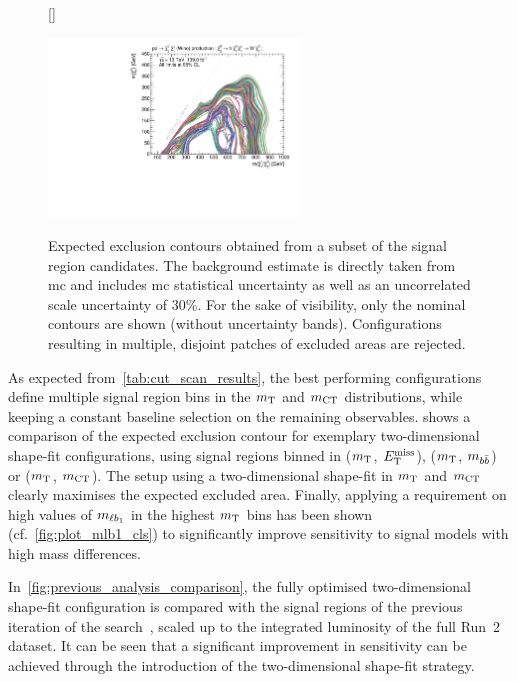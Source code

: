 \begin{figure}
[\FBwidth]
{\caption{Expected exclusion contours obtained from a subset of the signal region candidates. The background estimate is directly taken from \gls{mc} and includes \gls{mc} statistical uncertainty as well as an uncorrelated scale uncertainty of 30\%. For the sake of visibility, only the nominal contours are shown (without uncertainty bands). Configurations resulting in multiple, disjoint patches of excluded areas are rejected.}\label{fig:fit_scan_optimisation}}
{\includegraphics[width=0.60\textwidth]{HF/batch_compare}}
\end{figure}

As expected from~\cref{tab:cut_scan_results}, the best performing configurations define multiple signal region bins in the $m_{\textrm{T}}$ and $m_{\textrm{CT}}$ distributions, while keeping a constant baseline selection on the remaining observables.
 shows a comparison of the expected exclusion contour for exemplary two-dimensional shape-fit configurations, using signal regions binned in ($m_{\textrm{T}}$, $E_{\textrm{T}}^{\textrm{miss}}$), ($m_{\textrm{T}}$, $m_{b\bar{b}}$) or ($m_{\textrm{T}}$, $m_{\textrm{CT}}$).
The setup using a two-dimensional shape-fit in $m_{\textrm{T}}$ and $m_{\textrm{CT}}$ clearly maximises the expected excluded area.
Finally, applying a requirement on high values of $m_{\ell b_{1}}$ in the highest $m_{\textrm{T}}$ bins has been shown (cf.~\cref{fig:plot_mlb1_cls}) to significantly improve sensitivity to signal models with high mass differences. 

In~\cref{fig:previous_analysis_comparison}, the fully optimised two-dimensional shape-fit configuration is compared with the signal regions of the previous iteration of the search~\cite{SUSY-2017-01}, scaled up to the integrated luminosity of the full Run~2 dataset.
It can be seen that a significant improvement in sensitivity can be achieved through the introduction of the two-dimensional shape-fit strategy.

